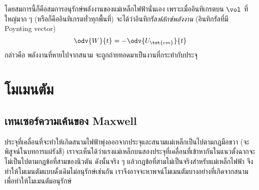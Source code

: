 โดยสมการนี้ก็คือสมการอนุรักษ์พลังงานของแม่เหล็กไฟฟ้านั่นเอง เพราะเมื่ออินทิเกรตบน $\vol$ ที่ใหญ่มาก ๆ (หรือก็คืออินทิเกรตทั่วทุกพื้นที่) จะได้ว่าอินทิกรัล\emph{ฟลักซ์พลังงาน} (อินทิกรัลที่มี Poynting vector)
\begin{equation}
    \odv{W}{t} = -\odv{U_\txt{em}}{t}
\end{equation}
กล่าวคือ พลังงานที่หายไปจากสนาม จะถูกถ่ายทอดมาเป็นงานที่กระทำกับประจุ

\section{โมเมนตัม}

\subsection{เทนเซอร์ความเค้นของ Maxwell}

ประจุที่เคลื่อนที่จะทำให้เกิดสนามไฟฟ้าพุ่งออกจากประจุและสนามแม่เหล็กเป็นไปตามกฎมือขวา (จะพิสูจน์ในบทการแผ่รังสี) เราจะเห็นได้ว่าแรงแม่เหล็กบนสองประจุที่เคลื่อนที่เข้าหากันในแนวตั้งฉากจะไม่เป็นไปตามกฎข้อที่สามของนิวตัน ดังนั้นจริง ๆ แล้วกฎข้อที่สามไม่เป็นจริงสำหรับแม่เหล็กไฟฟ้า จึงทำให้โมเมนตัมแบบดั้งเดิมไม่อนุรักษ์เช่นกัน เราจึงอาจจะหาพจน์โมเมนตัมบางอย่างที่เกิดจากสนามเพื่อทำให้โมเมนตัมอนุรักษ์

